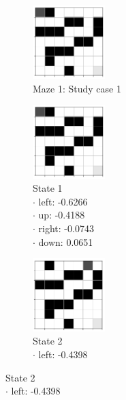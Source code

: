 \documentclass[a4paper]{article}    %
\begin{document}
\begin{figure}[H]
    \centering
    \begin{subfigure}{0.24\textwidth}
        \centering
        \includegraphics[width=2.8cm]{maze1-case1-state1}
        \caption{Maze 1: Study case 1 \vspace{12mm}}
        \label{fig:maze1-case1-states}
    \end{subfigure}
    \hfill
    \centering
    \begin{subfigure}{0.24\textwidth}
        \centering
        \includegraphics[width=2.8cm]{maze1-case1-state1}
        \caption{State 1 \\
            \scriptsize
            \hspace*{5mm} $\boldsymbol{\cdot}$ left:  -0.6266 \\
            \hspace*{5mm} $\boldsymbol{\cdot}$ up:    -0.4188 \\
            \hspace*{5mm} $\boldsymbol{\cdot}$ right: -0.0743 \\
            \hspace*{5mm} $\boldsymbol{\cdot}$ down:   0.0651 }
        \label{fig:maze1-case1-state1}
    \end{subfigure}
    \hfill
    \begin{subfigure}{0.24\textwidth}
        \centering
        \includegraphics[width=2.8cm]{maze1-case1-state2}
        \caption{State 2 \\
            \scriptsize
            \hspace*{5mm} $\boldsymbol{\cdot}$ left:  -0.4398 \\
}
\end{subfigure}
\end{figure}
\end{document}
